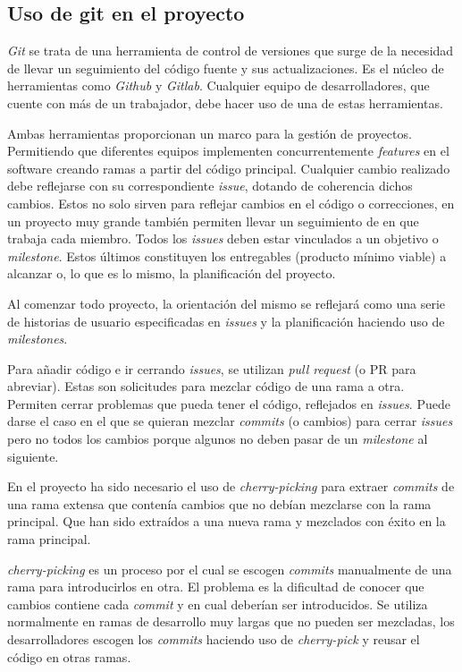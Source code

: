 \begin{enumerate}
\section{Uso de git en el proyecto}
\emph{Git} se trata de una herramienta de control de versiones que surge de la necesidad de llevar un seguimiento del código fuente y sus actualizaciones. Es el núcleo de herramientas como \emph{Github} y \emph{Gitlab}. Cualquier equipo de desarrolladores, que cuente con más de un trabajador, debe hacer uso de una de estas herramientas.

Ambas herramientas proporcionan un marco para la gestión de proyectos. Permitiendo que diferentes equipos implementen concurrentemente \emph{features} en el software creando ramas a partir del código principal. Cualquier cambio realizado debe reflejarse con su correspondiente \emph{issue}, dotando de coherencia dichos cambios. Estos no solo sirven para reflejar cambios en el código o correcciones, en un proyecto muy grande también permiten llevar un seguimiento de en que trabaja cada miembro. Todos los \emph{issues} deben estar vinculados a un objetivo o \emph{milestone}. Estos últimos constituyen los entregables (producto mínimo viable) a alcanzar o, lo que es lo mismo, la planificación del proyecto.

Al comenzar todo proyecto, la orientación del mismo se reflejará como una serie de historias de usuario especificadas en \emph{issues} y la planificación haciendo uso de \emph{milestones}.

Para añadir código e ir cerrando \emph{issues}, se utilizan \emph{pull request} (o PR para abreviar). Estas son solicitudes para mezclar código de una rama a otra. Permiten cerrar problemas que pueda tener el código, reflejados en \emph{issues}. Puede darse el caso en el que se quieran mezclar \emph{commits} (o cambios) para cerrar \emph{issues} pero no todos los cambios porque algunos no deben pasar de un \emph{milestone} al siguiente.

En el proyecto ha sido necesario el uso de \emph{cherry-picking} para extraer \emph{commits} de una rama extensa que contenía cambios que no debían mezclarse con la rama principal. Que han sido extraídos a una nueva rama y mezclados con éxito en la rama principal.

\emph{cherry-picking} es un proceso por el cual se escogen \emph{commits} manualmente de una rama para introducirlos en otra. El problema es la dificultad de conocer que cambios contiene cada \emph{commit} y en cual deberían ser introducidos. Se utiliza normalmente en ramas de desarrollo muy largas que no pueden ser mezcladas, los desarrolladores escogen los \emph{commits} haciendo uso de \emph{cherry-pick} y reusar el código en otras ramas.\cite{bunyakiati2017cherry}


\end{enumerate}
